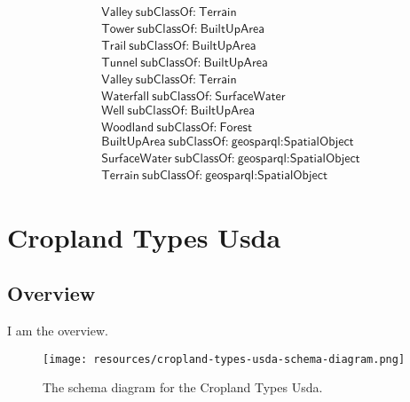 \begin{align}
  \textsf{Valley}~\textsf{subClassOf:}~\textsf{Terrain}\\
  \textsf{Tower}~\textsf{subClassOf:}~\textsf{BuiltUpArea}\\
  \textsf{Trail}~\textsf{subClassOf:}~\textsf{BuiltUpArea}\\
  \textsf{Tunnel}~\textsf{subClassOf:}~\textsf{BuiltUpArea}\\
  \textsf{Valley}~\textsf{subClassOf:}~\textsf{Terrain}\\
  \textsf{Waterfall}~\textsf{subClassOf:}~\textsf{SurfaceWater}\\
  \textsf{Well}~\textsf{subClassOf:}~\textsf{BuiltUpArea}\\
  \textsf{Woodland}~\textsf{subClassOf:}~\textsf{Forest}\\
  \textsf{BuiltUpArea}~\textsf{subClassOf:}~\textsf{geosparql:SpatialObject}\\
  \textsf{SurfaceWater}~\textsf{subClassOf:}~\textsf{geosparql:SpatialObject}\\
  \textsf{Terrain}~\textsf{subClassOf:}~\textsf{geosparql:SpatialObject}\end{align}



\section{Cropland Types Usda}
\label{sec:cropland-types-usda}
\subsection{Overview}
\label{ssec:overview}

I am the overview.

\begin{figure}[h!]
  \begin{center}
    \texttt{[image: resources/cropland-types-usda-schema-diagram.png]}
  \end{center}
  \caption{The schema diagram for the Cropland Types Usda.}
  \label{fig:ov-diagram}
\end{figure}


